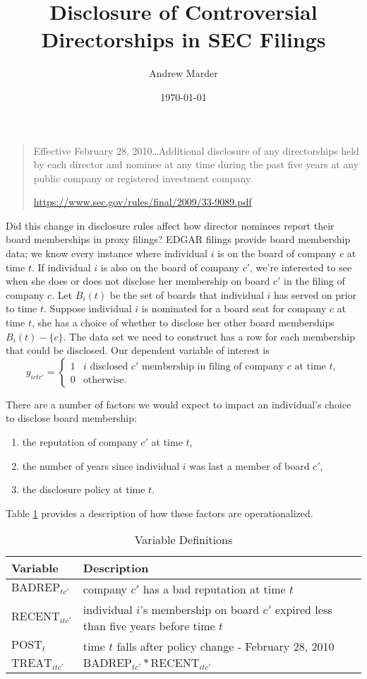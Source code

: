 \documentclass{article}
\title{Disclosure of Controversial Directorships in SEC Filings}
\author{Andrew Marder}
\date{\today}
\newcommand{\1}{\mathds{1}}
\begin{document}
\maketitle

\begin{quote}
  Effective February 28, 2010\dots Additional disclosure of any
  directorships held by each director and nominee at any time during
  the past five years at any public company or registered investment
  company.

  \url{https://www.sec.gov/rules/final/2009/33-9089.pdf}
\end{quote}

Did this change in disclosure rules affect how director nominees
report their board memberships in proxy filings?  EDGAR filings
provide board membership data; we know every instance where
individual $i$ is on the board of company $c$ at time $t$. If
individual $i$ is also on the board of company $c'$, we're interested
to see when she does or does not disclose her membership on board
$c'$ in the filing of company $c$. Let $B_i(t)$ be the set of boards that individual $i$ has served
on prior to time $t$. Suppose individual $i$ is nominated for a board
seat for company $c$ at time $t$, she has a choice of whether to
disclose her other board memberships $B_i(t) - \{ c \}$. The data set
we need to construct has a row for each membership that could be
disclosed. Our dependent variable of interest is
\[
y_{ictc'} = \begin{cases}
1 & \text{$i$ disclosed $c'$ membership in filing of company $c$ at time $t$}, \\
0 & \text{otherwise}.
\end{cases}
\]

There are a number of factors we would expect to impact an
individual's choice to disclose board membership:
\begin{enumerate}
\item the reputation of company $c'$ at time $t$,
\item the number of years since individual $i$ was last a member of
  board $c'$,
\item the disclosure policy at time $t$.
\end{enumerate}
Table \ref{tab:vardefs} provides a description of how these factors are
operationalized.

\begin{table}
\centering
\begin{tabular}{lp{3in}}
\toprule
Variable & Description \\
\midrule
$\text{BADREP}_{tc'}$ & company $c'$ has a bad reputation at time $t$ \\
$\text{RECENT}_{itc'}$ & individual $i$'s membership on board $c'$
                      expired less than five years before time $t$ \\
$\text{POST}_t$ & time $t$ falls after policy change - February 28, 2010 \\
$\text{TREAT}_{itc'}$ & $\text{BADREP}_{tc'} * \text{RECENT}_{itc'}$ \\
\bottomrule
\end{tabular}
\caption{\label{tab:vardefs}Variable Definitions}
\end{table}
\end{document}
